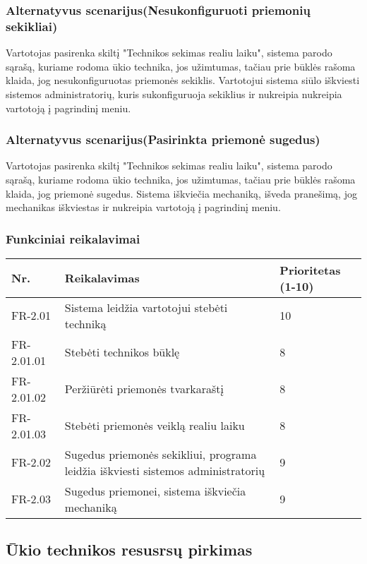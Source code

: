 \documentclass[oneside]{VUMIFPSkursinis}
\begin{document}
\subsubsection{Alternatyvus scenarijus(Nesukonfiguruoti priemonių sekikliai)}
	Vartotojas pasirenka skiltį "Technikos sekimas realiu laiku", sistema parodo sąrašą, kuriame rodoma ūkio technika, jos užimtumas, tačiau prie būklės rašoma klaida, jog nesukonfiguruotas priemonės sekiklis. Vartotojui sistema siūlo iškviesti sistemos administratorių, kuris sukonfiguruoja sekiklius ir nukreipia nukreipia vartotoją į pagrindinį meniu.
\subsubsection{Alternatyvus scenarijus(Pasirinkta priemonė sugedus)}
	Vartotojas pasirenka skiltį "Technikos sekimas realiu laiku", sistema parodo sąrašą, kuriame rodoma ūkio technika, jos užimtumas, tačiau prie būklės rašoma klaida, jog priemonė sugedus. Sistema iškviečia mechaniką, išveda pranešimą, jog mechanikas iškviestas ir nukreipia vartotoją į pagrindinį meniu.
\subsubsection{Funkciniai reikalavimai}
\begin{table}[htbp]
	\begin{tabularx}{1\textwidth}{ |P{2.5cm}|X|P{3cm }| }  \hline
           	Nr. & Reikalavimas &  Prioritetas (1-10)  \\   \hline 
         		FR-2.01 & Sistema leidžia vartotojui stebėti techniką & 10  \\   \hline
		FR-2.01.01 & Stebėti technikos būklę & 8 \\ \hline
		FR-2.01.02 & Peržiūrėti priemonės tvarkaraštį & 8 \\ \hline
		FR-2.01.03 & Stebėti priemonės veiklą realiu laiku & 8 \\ \hline
        		FR-2.02 & Sugedus priemonės sekikliui, programa leidžia iškviesti sistemos administratorių & 9   \\   \hline
			FR-2.03 & Sugedus priemonei, sistema iškviečia mechaniką & 9 \\ \hline
	\end{tabularx}
\end{table}

\subsection{Ūkio technikos resusrsų pirkimas}
\end{document}
